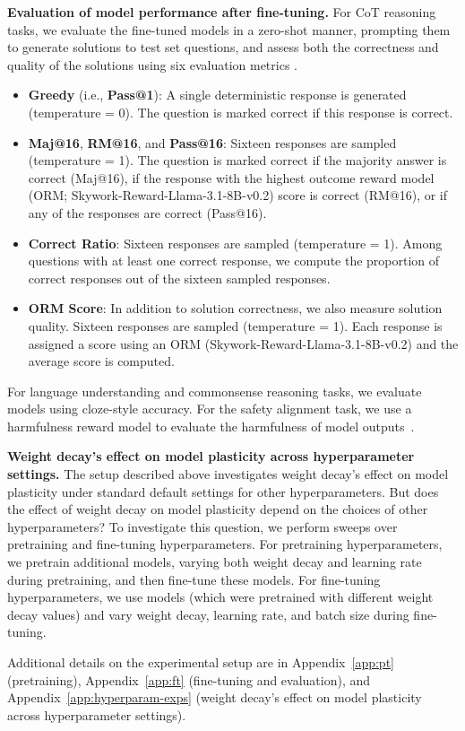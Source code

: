 \textbf{Evaluation of model performance after fine-tuning.} For CoT reasoning tasks, we evaluate the fine-tuned models in a zero-shot manner, prompting them to generate solutions to test set questions, and assess both the correctness and quality of the solutions using six evaluation metrics \citep{qi2025evolm}.

\vspace{-0.2cm}
\begin{itemize}[leftmargin=*, itemsep=1pt]
\item \textbf{Greedy} (i.e., \textbf{Pass@1}): A single deterministic response is generated (temperature = 0). The question is marked correct if this response is correct.

\item \textbf{Maj@16}, \textbf{RM@16}, and \textbf{Pass@16}: Sixteen responses are sampled (temperature = 1). The question is marked correct if the majority answer is correct (Maj@16), if the response with the highest outcome reward model (ORM; Skywork-Reward-Llama-3.1-8B-v0.2) score is correct (RM@16), or if any of the responses are correct (Pass@16).

\item \textbf{Correct Ratio}: Sixteen responses are sampled (temperature = 1). Among questions with at least one correct response, we compute the proportion of correct responses out of the sixteen sampled responses.

\item \textbf{ORM Score}: In addition to solution correctness, we also measure solution quality. Sixteen responses are sampled (temperature = 1). Each response is assigned a score using an ORM (Skywork-Reward-Llama-3.1-8B-v0.2) and the average score is computed.

\end{itemize}

\vspace{-0.2cm}

For language understanding and commonsense reasoning tasks, we evaluate models using cloze-style accuracy. For the safety alignment task, we use a harmfulness reward model to evaluate the harmfulness of model outputs~\citep{bianchi2024safety}.

\textbf{Weight decay’s effect on model plasticity across hyperparameter settings.} The setup described above investigates weight decay's effect on model plasticity under standard default settings for other hyperparameters. But does the effect of weight decay on model plasticity depend on the choices of other hyperparameters?
To investigate this question, we perform sweeps over pretraining and fine-tuning hyperparameters.
For pretraining hyperparameters, we pretrain additional \olmoonex{} models, varying both weight decay and learning rate during pretraining, and then fine-tune these models.
For fine-tuning hyperparameters, we use \olmoonex{} models (which were pretrained with different weight decay values) and vary weight decay, learning rate, and batch size during fine-tuning.

Additional details on the experimental setup are in Appendix~\ref{app:pt} (pretraining), Appendix~\ref{app:ft} (fine-tuning and evaluation), and Appendix~\ref{app:hyperparam-exps} (weight decay’s effect on model plasticity across hyperparameter settings).


